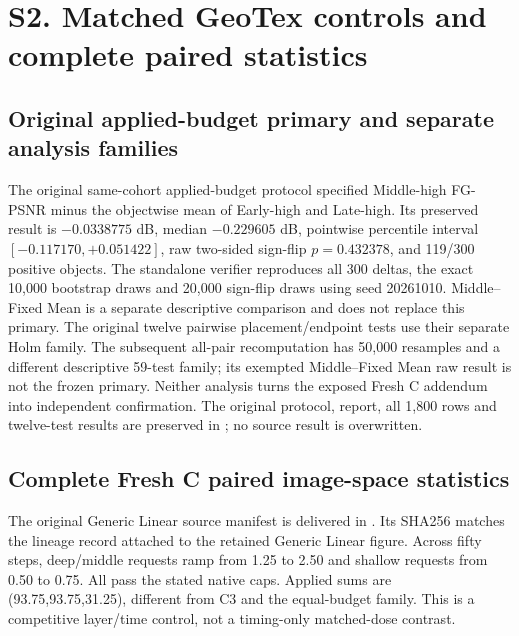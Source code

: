 \documentclass[11pt]{article}
\begin{document}
\endgroup

\FloatBarrier
\section*{S2. Matched GeoTex controls and complete paired statistics}
\label{supp:group2}

\subsection*{Original applied-budget primary and separate analysis families}\label{supp:budget-primary}
The original same-cohort applied-budget protocol specified Middle-high FG-PSNR minus the objectwise mean of Early-high and Late-high. Its preserved result is $-0.0338775$ dB, median $-0.229605$ dB, pointwise percentile interval $[-0.117170,+0.051422]$, raw two-sided sign-flip $p=0.432378$, and 119/300 positive objects. The standalone verifier reproduces all 300 deltas, the exact 10,000 bootstrap draws and 20,000 sign-flip draws using seed 20261010. Middle--Fixed Mean is a separate descriptive comparison and does not replace this primary. The original twelve pairwise placement/endpoint tests use their separate Holm family. The subsequent all-pair recomputation has 50,000 resamples and a different descriptive 59-test family; its exempted Middle--Fixed Mean raw result is not the frozen primary. Neither analysis turns the exposed Fresh C addendum into independent confirmation. The original protocol, report, all 1,800 rows and twelve-test results are preserved in ; no source result is overwritten.

\subsection*{Complete Fresh C paired image-space statistics}\label{supp:freshc-complete}
The original Generic Linear source manifest is delivered in . Its SHA256 matches the lineage record attached to the retained Generic Linear figure. Across fifty steps, deep/middle requests ramp from 1.25 to 2.50 and shallow requests from 0.50 to 0.75. All pass the stated native caps. Applied sums are (93.75,93.75,31.25), different from C3 and the equal-budget family. This is a competitive layer/time control, not a timing-only matched-dose contrast.
\end{document}
